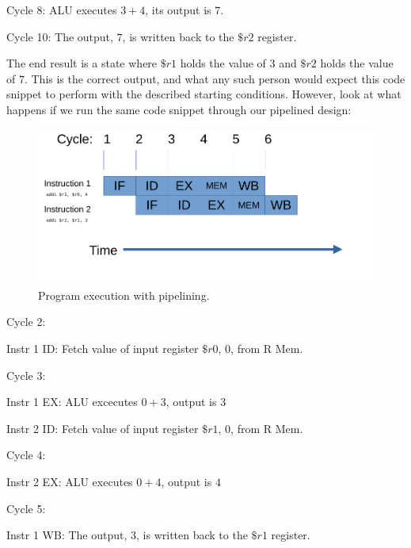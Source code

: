 \documentclass[12pt,twoside]{reedthesis}
\begin{document}
Cycle 8: ALU executes $3 + 4$, its output is $7$.

Cycle 10: The output, $7$, is written back to the $\$r2$ register.

\vspace{5mm}

The end result is a state where $\$r1$ holds the value of $3$ and $\$r2$ holds the value of $7$. This is the correct output, and what any such person would expect this code snippet to perform with the described starting conditions. However, look at what happens if we run the same code snippet through our pipelined design:

\begin{figure}[h!]

	\centering
	\includegraphics[scale=0.7]{pipeline}
	\caption{Program execution with pipelining.}
	\label{pipeline}
\end{figure}

Cycle 2:

\qquad Instr 1 ID:  Fetch value of input register $\$r0$, $0$, from R Mem.

Cycle 3:

\qquad Instr 1 EX: ALU excecutes $0 + 3$, output is $3$

\qquad Instr 2 ID: Fetch value of input register $\$r1$, $0$, from R Mem.

Cycle 4:

\qquad Instr 2 EX: ALU executes $0 + 4$, output is $4$

Cycle 5:

\qquad Instr 1 WB: The output, $3$, is written back to the $\$r1$ register.
\end{document}
